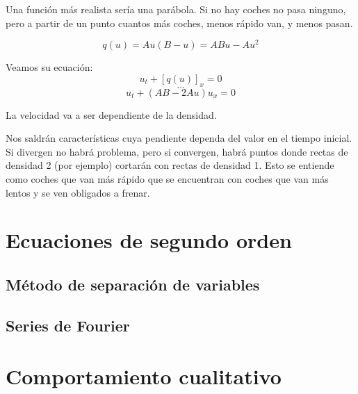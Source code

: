 \documentclass[palatino]{apuntes}
\begin{document}
Una función más realista sería una parábola. Si no hay coches no pasa ninguno, pero a partir de un punto cuantos más coches, menos rápido van, y menos pasan.

$$ q(u) = Au (B-u) = ABu - Au^{2} $$

Veamos su ecuación:
$$u_t + [q(u)]_x = 0$$
$$ … $$
$$ u_t + (AB - 2Au) u_x = 0 $$

La velocidad va a ser dependiente de la densidad.

Nos saldrán características cuya pendiente dependa del valor en el tiempo inicial. Si divergen no habrá problema, pero si convergen, habrá puntos donde rectas de densidad 2 (por ejemplo) cortarán con rectas de densidad 1. Esto se entiende como coches que van más rápido que se encuentran con coches que van más lentos y se ven obligados a frenar.






\chapter{Ecuaciones de segundo orden}
\label{chap:EcuacionesSegundoOrden}

\section{Método de separación de variables}

\section{Series de Fourier}

\chapter{Comportamiento cualitativo}

\appendix

{}
\printindex
\end{document}
